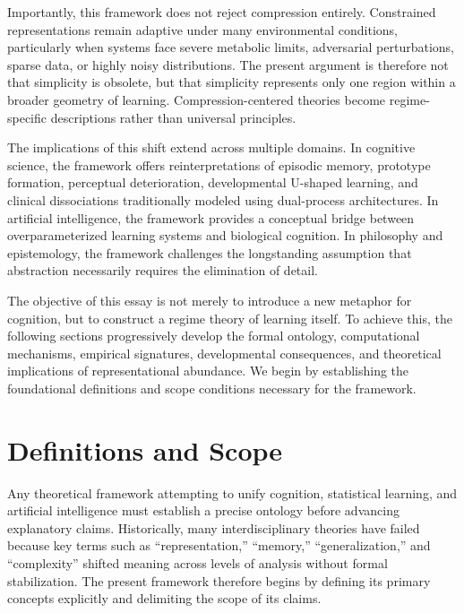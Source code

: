 \documentclass[12pt,a4paper]{article}
\begin{document}
Importantly, this framework does not reject compression entirely. Constrained representations remain adaptive under many environmental conditions, particularly when systems face severe metabolic limits, adversarial perturbations, sparse data, or highly noisy distributions. The present argument is therefore not that simplicity is obsolete, but that simplicity represents only one region within a broader geometry of learning. Compression-centered theories become regime-specific descriptions rather than universal principles.

The implications of this shift extend across multiple domains. In cognitive science, the framework offers reinterpretations of episodic memory, prototype formation, perceptual deterioration, developmental U-shaped learning, and clinical dissociations traditionally modeled using dual-process architectures. In artificial intelligence, the framework provides a conceptual bridge between overparameterized learning systems and biological cognition. In philosophy and epistemology, the framework challenges the longstanding assumption that abstraction necessarily requires the elimination of detail.

The objective of this essay is not merely to introduce a new metaphor for cognition, but to construct a regime theory of learning itself. To achieve this, the following sections progressively develop the formal ontology, computational mechanisms, empirical signatures, developmental consequences, and theoretical implications of representational abundance. We begin by establishing the foundational definitions and scope conditions necessary for the framework.


\section{Definitions and Scope}

Any theoretical framework attempting to unify cognition, statistical learning, and artificial intelligence must establish a precise ontology before advancing explanatory claims. Historically, many interdisciplinary theories have failed because key terms such as ``representation,'' ``memory,'' ``generalization,'' and ``complexity'' shifted meaning across levels of analysis without formal stabilization. The present framework therefore begins by defining its primary concepts explicitly and delimiting the scope of its claims.
\end{document}

